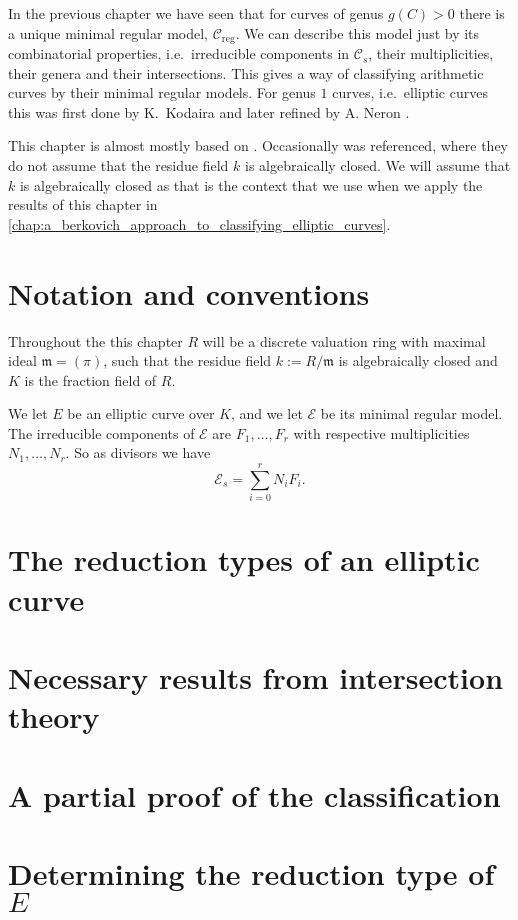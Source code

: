 In the previous chapter we have seen that for curves of genus $g(C) > 0$ there is a unique minimal regular model, $\mathscr C_\text{reg} $.
We can describe this model just by its combinatorial properties, i.e.\ irreducible components in $\mathscr C_s$, their multiplicities, their genera and their intersections.
This gives a way of classifying arithmetic curves by their minimal regular models. 
For genus $1$ curves, i.e.\ elliptic curves this was first done by K.\ Kodaira \cite{kodairaCompactAnalyticSurfaces1963} and later refined by A. Neron \cite{neronModelesMinimauxVarietes1964}.

This chapter is almost mostly based on \cite[][\S 8]{silvermanAdvancedTopicsArithmetic1994}. Occasionally \cite[sec.\ 10.2]{liuAlgebraicGeometryArithmetic2002} was referenced, where they do not assume that the residue field $k$ is algebraically closed. 
We will assume that $k$ is algebraically closed as that is the context that we use when we apply the results of this chapter in \cref{chap:a_berkovich_approach_to_classifying_elliptic_curves}.

\section{Notation and conventions} \label{sec:notation_and_conventions}

Throughout the this chapter $R$ will be a discrete valuation ring with maximal ideal $\mathfrak{m} = (\pi) $, such that the residue field $k := R / \mathfrak{m} $ is algebraically closed and $K$ is the fraction field of $R$. 

We let $E$ be an elliptic curve over $K$, and we let $\mathscr E$ be its minimal regular model. 
The irreducible components of $\mathscr E$ are $F_1, \ldots, F_r$ with respective multiplicities $N_1, \ldots, N_r$. 
So as divisors we have  
\begin{equation}\label{eq:decomposition_fibre}
	\mathscr E_s = \sum_{i = 0}^{r} N_i F_i.
\end{equation}

\section{The reduction types of an elliptic curve} \label{sec:the_reduction_types_of_an_elliptic_curve}


\section{Necessary results from intersection theory} \label{sec:necessary_results_from_intersection_theory}



\section{A partial proof of the classification} \label{sec:a_partial_proof_of_the_classification}


\section{Determining the reduction type of $E$} \label{sec:determining_the_reduction_type_of_e}






